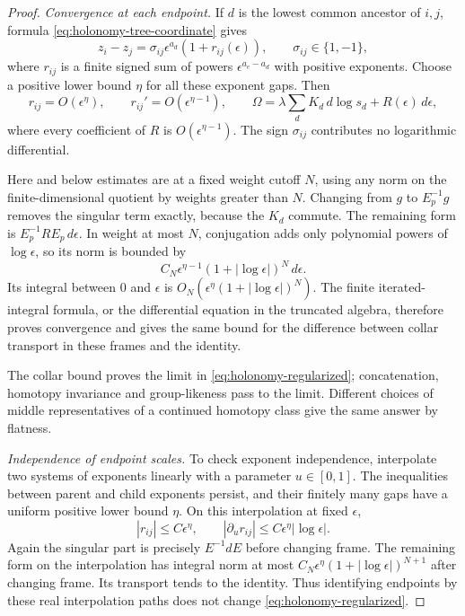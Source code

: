 \documentclass[11pt]{article}
\theoremstyle{definition}
\theoremstyle{remark}
\numberwithin{equation}{section}
\begin{document}
\begin{proof}
\emph{Convergence at each endpoint.}
If $d$ is the lowest common ancestor of $i,j$, formula
\eqref{eq:holonomy-tree-coordinate} gives
\begin{equation}\label{eq:holonomy-collar-difference}
 z_i-z_j=\sigma_{ij}\epsilon^{a_d}(1+r_{ij}(\epsilon)),
 \qquad \sigma_{ij}\in\{1,-1\},
\end{equation}
where $r_{ij}$ is a finite signed sum of powers
$\epsilon^{a_e-a_d}$ with positive exponents.  Choose a positive lower
bound $\eta$ for all these exponent gaps.  Then
\[
 r_{ij}=O(\epsilon^\eta),\qquad
 r_{ij}'=O(\epsilon^{\eta-1}),\qquad
 \Omega=\lambda\sum_d K_d\,d\log s_d+R(\epsilon)\,d\epsilon,
\]
where every coefficient of $R$ is $O(\epsilon^{\eta-1})$.
The sign $\sigma_{ij}$ contributes no logarithmic differential.

Here and below estimates are at a fixed weight cutoff $N$, using any
norm on the finite-dimensional quotient by weights greater than $N$.
Changing from $g$ to $E_p^{-1}g$ removes the singular term exactly,
because the $K_d$ commute.  The remaining form is
$E_p^{-1}R E_p\,d\epsilon$.  In weight at most $N$, conjugation adds
only polynomial powers of $\log\epsilon$, so its norm is bounded by
\begin{equation}\label{eq:holonomy-collar-bound}
 C_N\epsilon^{\eta-1}(1+|\log\epsilon|)^N\,d\epsilon.
\end{equation}
Its integral between $0$ and $\epsilon$ is
$O_N(\epsilon^\eta(1+|\log\epsilon|)^N)$.
The finite iterated-integral formula, or the differential equation in
the truncated algebra, therefore proves convergence and gives the
same bound for the difference between collar transport in these
frames and the identity.

The collar bound proves the limit in
\eqref{eq:holonomy-regularized}; concatenation, homotopy invariance
and group-likeness pass to the limit.  Different choices of middle
representatives of a continued homotopy class give the same answer by
flatness.

\emph{Independence of endpoint scales.}
To check exponent independence, interpolate two systems of exponents
linearly with a parameter $u\in[0,1]$.  The inequalities between parent
and child exponents persist, and their finitely many gaps have a
uniform positive lower bound $\eta$.  On this interpolation at fixed
$\epsilon$,
\[
 |r_{ij}|\leq C\epsilon^\eta,
 \qquad |\partial_u r_{ij}|
 \leq C\epsilon^\eta|\log\epsilon|.
\]
Again the singular part is precisely $E^{-1}dE$ before changing frame.
The remaining form on the interpolation has integral norm at most
$C_N\epsilon^\eta(1+|\log\epsilon|)^{N+1}$ after changing frame.
Its transport tends to the identity.  Thus identifying endpoints by
these real interpolation paths does not change
\eqref{eq:holonomy-regularized}.


\end{proof}
\end{document}
